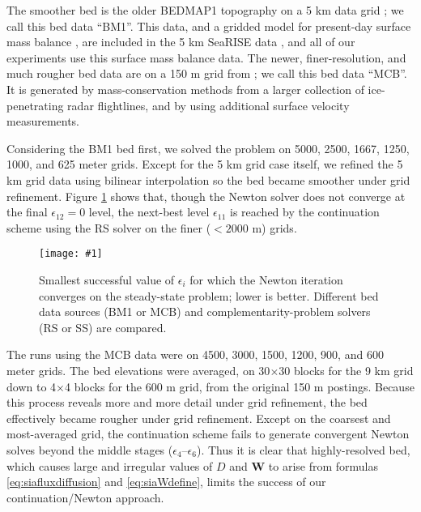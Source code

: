 \documentclass[twocolumn,letterpaper]{igs}
\newcommand{\onecol}[1]{\texttt{[image: \#1]}}
\newcommand\bW{\mathbf{W}}
\newcommand\eps{\epsilon}
\begin{document}
\newcommand{\BM}{\textsf{BM1}\xspace}
\newcommand{\MCB}{\textsf{MCB}\xspace}
\newcommand{\virs}{\textsf{RS}\xspace}
\newcommand{\viss}{\textsf{SS}\xspace}

The smoother bed is the older BEDMAP1 topography on a 5 km data grid \citep{Bamberetal2001}; we call this bed data ``\BM''.  This data, and a gridded model for present-day surface mass balance \citep{Ettemaetal2009}, are included in the 5 km SeaRISE data \citep{Bindschadleretal2013}, and all of our experiments use this surface mass balance data.  The newer, finer-resolution, and much rougher bed data are on a 150 m grid from \cite{Morlighemetal2014}; we call this bed data ``\MCB''.  It is generated by mass-conservation methods from a larger collection of ice-penetrating radar flightlines, and by using additional surface velocity measurements.

Considering the \BM bed first, we solved the problem on 5000, 2500, 1667, 1250, 1000, and 625 meter grids.  Except for the 5 km grid case itself, we refined the 5 km grid data using bilinear interpolation so the bed became smoother under grid refinement.  Figure \ref{fig:grnrobusteps} shows that, though the Newton solver does not converge at the final $\eps_{12}=0$ level, the next-best level $\eps_{11}$ is reached by the continuation scheme using the \virs solver on the finer ($<2000$ m) grids.

\begin{figure}[ht]
\onecol{grnrobusteps.pdf}
\caption{Smallest successful value of $\eps_i$ for which the Newton iteration converges on the steady-state problem; lower is better.  Different bed data sources (\BM or \MCB) and complementarity-problem solvers (\virs or \viss) are compared.}
\label{fig:grnrobusteps}
\end{figure}

The runs using the \MCB data were on 4500, 3000, 1500, 1200, 900, and 600 meter grids.  The bed elevations were averaged, on 30$\times$30 blocks for the 9 km grid down to 4$\times$4 blocks for the 600 m grid, from the original 150 m postings.  Because this process reveals more and more detail under grid refinement, the bed effectively became rougher under grid refinement.  Except on the coarsest and most-averaged grid, the continuation scheme fails to generate convergent Newton solves beyond the middle stages ($\eps_4$--$\eps_6$).  Thus it is clear that highly-resolved bed, which causes large and irregular values of $D$ and $\bW$ to arise from formulas \eqref{eq:siafluxdiffusion} and \eqref{eq:siaWdefine}, limits the success of our continuation/Newton approach.
\end{document}
